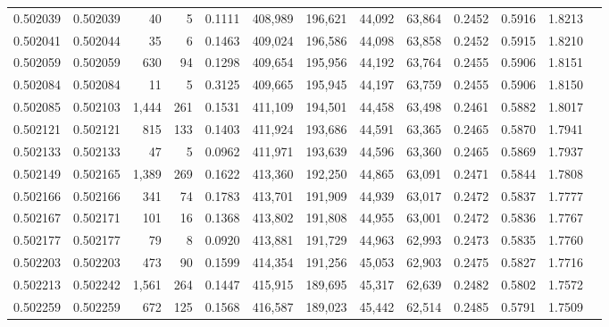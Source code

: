 \begin{tabular}{rrrrrrrrrrrrr}
0.502039 & 0.502039 &    40 &     5 &                                     0.1111 & 408,989 & 196,621 &  44,092 &  63,864 & 0.2452 & 0.5916 & 1.8213 \\
0.502041 & 0.502044 &    35 &     6 &                                     0.1463 & 409,024 & 196,586 &  44,098 &  63,858 & 0.2452 & 0.5915 & 1.8210 \\
0.502059 & 0.502059 &   630 &    94 &                                     0.1298 & 409,654 & 195,956 &  44,192 &  63,764 & 0.2455 & 0.5906 & 1.8151 \\
0.502084 & 0.502084 &    11 &     5 &                                     0.3125 & 409,665 & 195,945 &  44,197 &  63,759 & 0.2455 & 0.5906 & 1.8150 \\
0.502085 & 0.502103 & 1,444 &   261 &                                     0.1531 & 411,109 & 194,501 &  44,458 &  63,498 & 0.2461 & 0.5882 & 1.8017 \\
0.502121 & 0.502121 &   815 &   133 &                                     0.1403 & 411,924 & 193,686 &  44,591 &  63,365 & 0.2465 & 0.5870 & 1.7941 \\
0.502133 & 0.502133 &    47 &     5 &                                     0.0962 & 411,971 & 193,639 &  44,596 &  63,360 & 0.2465 & 0.5869 & 1.7937 \\
0.502149 & 0.502165 & 1,389 &   269 &                                     0.1622 & 413,360 & 192,250 &  44,865 &  63,091 & 0.2471 & 0.5844 & 1.7808 \\
0.502166 & 0.502166 &   341 &    74 &                                     0.1783 & 413,701 & 191,909 &  44,939 &  63,017 & 0.2472 & 0.5837 & 1.7777 \\
0.502167 & 0.502171 &   101 &    16 &                                     0.1368 & 413,802 & 191,808 &  44,955 &  63,001 & 0.2472 & 0.5836 & 1.7767 \\
0.502177 & 0.502177 &    79 &     8 &                                     0.0920 & 413,881 & 191,729 &  44,963 &  62,993 & 0.2473 & 0.5835 & 1.7760 \\
0.502203 & 0.502203 &   473 &    90 &                                     0.1599 & 414,354 & 191,256 &  45,053 &  62,903 & 0.2475 & 0.5827 & 1.7716 \\
0.502213 & 0.502242 & 1,561 &   264 &                                     0.1447 & 415,915 & 189,695 &  45,317 &  62,639 & 0.2482 & 0.5802 & 1.7572 \\
0.502259 & 0.502259 &   672 &   125 &                                     0.1568 & 416,587 & 189,023 &  45,442 &  62,514 & 0.2485 & 0.5791 & 1.7509 \\

\end{tabular}
